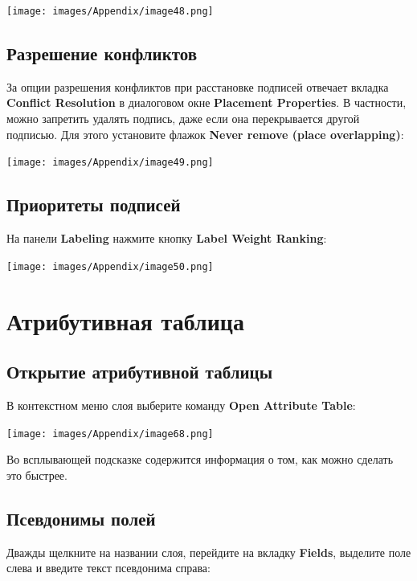 \documentclass[12pt,]{book}
\begin{document}
\texttt{[image: images/Appendix/image48.png]}

\hypertarget{section-32}{%
\section{Разрешение конфликтов}\label{section-32}}

За опции разрешения конфликтов при расстановке подписей отвечает вкладка \textbf{Conflict Resolution} в диалоговом окне \textbf{Placement Properties}. В частности, можно запретить удалять подпись, даже если она перекрывается другой подписью. Для этого установите флажок \textbf{Never remove (place overlapping)}:

\texttt{[image: images/Appendix/image49.png]}

\hypertarget{section-33}{%
\section{Приоритеты подписей}\label{section-33}}

На панели \textbf{Labeling} нажмите кнопку \textbf{Label Weight Ranking}:

\texttt{[image: images/Appendix/image50.png]}

\hypertarget{manual-attributes}{%
\chapter{Атрибутивная таблица}\label{manual-attributes}}

\hypertarget{section-34}{%
\section{Открытие атрибутивной таблицы}\label{section-34}}

В контекстном меню слоя выберите команду \textbf{Open Attribute Table}:

\texttt{[image: images/Appendix/image68.png]}

Во всплывающей подсказке содержится информация о том, как можно сделать это быстрее.

\hypertarget{section-35}{%
\section{Псевдонимы полей}\label{section-35}}

Дважды щелкните на названии слоя, перейдите на вкладку \textbf{Fields}, выделите поле слева и введите текст псевдонима справа:
\end{document}
